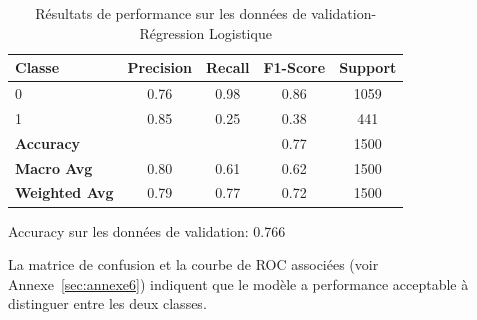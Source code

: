 \begin{table}[h]
\centering
\caption{Résultats de performance sur les données de validation-Régression Logistique}
\label{tab:performance_validation_RegL}
\begin{tabular}{|l|c|c|c|c|}
\hline
\textbf{Classe}       & \textbf{Precision} & \textbf{Recall} & \textbf{F1-Score} & \textbf{Support} \\ \hline
0                     & 0.76               & 0.98            & 0.86              & 1059             \\ \hline
1                     & 0.85               & 0.25            & 0.38              & 441              \\ \hline
\textbf{Accuracy} & \multicolumn{2}{|c|}{} & 0.77       & 1500     \\ \hline
\textbf{Macro Avg}    & 0.80               & 0.61            & 0.62              & 1500             \\ \hline
\textbf{Weighted Avg} & 0.79               & 0.77            & 0.72              & 1500             \\ \hline
\end{tabular}
\begin{flushleft}
Accuracy sur les données de validation: 0.766
\end{flushleft}
\end{table}

\begin{flushleft}
La matrice de confusion et la courbe de ROC associées (voir Annexe~\ref{sec:annexe6}) indiquent que le modèle a performance acceptable à distinguer entre les deux classes. 
\end{flushleft}

